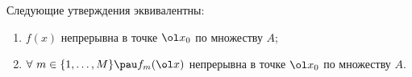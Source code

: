 
	 Следующие утверждения эквивалентны:
	 \begin{enumerate}
	   \item $f(x)$ непрерывна в точке $\ol x_0$ по множеству $A$;
	   \item $\forall\ m\in \{1,\ldots,M\}\pau f_m(\ol x)$ непрерывна в точке $\ol x_0$ по множеству $A$.
	 \end{enumerate}
	 